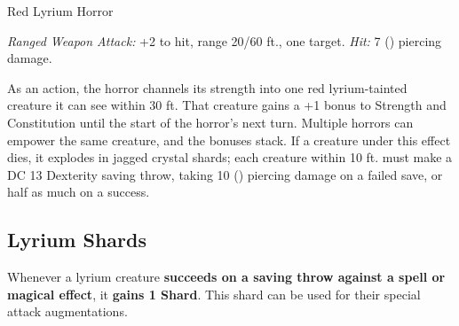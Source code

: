 \begin{monsterbox}{Red Lyrium Horror}
\begin{rpg-monsteraction}
\textit{Ranged Weapon Attack:} +2 to hit, range 20/60 ft., one target. \textit{Hit:} 7 () piercing damage.
\end{rpg-monsteraction}

\begin{rpg-monsteraction}
As an action, the horror channels its strength into one red lyrium-tainted creature it can see within 30 ft. That creature gains a +1 bonus to Strength and Constitution until the start of the horror's next turn. Multiple horrors can empower the same creature, and the bonuses stack. If a creature under this effect dies, it explodes in jagged crystal shards; each creature within 10 ft. must make a DC 13 Dexterity saving throw, taking 10 () piercing damage on a failed save, or half as much on a success.
\end{rpg-monsteraction}

\end{monsterbox}

\newpage

\subsection{Lyrium Shards}

Whenever a lyrium creature \textbf{succeeds on a saving throw against a spell or magical effect},
it \textbf{gains 1 Shard}. This shard can be used for their special attack augmentations.

\newpage
